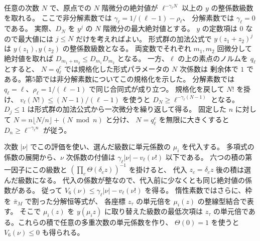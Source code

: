 任意の次数 \(N\) で、原点での \(N\) 階微分の絶対値が
\(\ell^{-\gamma_\ell N}\) 以上の \(y\) の整係数級数を取れる。
ここで非分解素数では \(\gamma_\ell=1/(\ell-1)-\rho_\ell\)、
分解素数では \(\gamma_\ell=0\) である。
実際、\(D_N\) を \(y^j\) の \(N\) 階微分の最大絶対値とする。
\(y\) の定数項は \(0\) なので最大値には \(j\le N\) だけを考えればよい。
形式群の加法公式で \(y(z_1+z_2)^j\) は \(y(z_1),y(z_2)\) の整係数級数となる。
両変数でそれぞれ \(m_1,m_2\) 回微分して絶対値を取れば
\(D_{m_1+m_2}\le D_{m_1}D_{m_2}\) となる。
一方、\(\ell\) の上の素点のノルムを \(q_\ell\) とすると、
\(N=q_\ell^e\) では規格化した形式パラメータの \(N\) 次係数は
剰余体で \(1\) である。第5節では非分解素数についてこの規格化を示した。
分解素数では \(q_\ell=\ell\)、\(\rho_\ell=1/(\ell-1)\) で同じ合同式が成り立つ。
規格化を戻して \(N!\) を掛け、
\(v_\ell(N!)\le(N-1)/(\ell-1)\) を使うと \(D_N\ge\ell^{-\gamma_\ell(N-1)}\) となる。
\(D_j\le1\) は形式群の加法公式から一次微分を繰り返して得る。
固定した \(n\) に対して \(N=n\lfloor N/n\rfloor+(N\bmod n)\) と分け、
\(N=q_\ell^e\) を無限に大きくすると \(D_n\ge\ell^{-\gamma_\ell n}\) が従う。

次数 \(|\nu|\) でこの評価を使い、選んだ級数に単元係数の \(\mu_i\) を代入する。
多項式の係数の展開から、\(\nu\) 次係数の付値は
\(\gamma_\ell|\nu|-v_\ell(\nu!)\) 以下である。
六つの積の第一因子にこの級数と \((\prod_c\Theta(\delta_c z))^{-1}\) を掛けると、
代入 \(z_c=\delta_c z\) 後の積は選んだ級数になる。
代入の係数が整なので、代入前に少なくとも同じ絶対値の係数がある。
従って \(V_6(\nu)\le\gamma_\ell|\nu|-v_\ell(\nu!)\) を得る。
惰性素数ではさらに、枠を \(\bar\pi_M\) で割った分解恒等式が、
各座標 \(z_\tau\) の単元倍を \(\mu_i(z)\) の整線型結合で表す。
そこで \(\mu_i(z)\) を \(y(\mu_i z)\) に取り替えた級数の最低次項は
\(z_\tau\) の単元倍である。これらの積で任意の多重次数の単元係数を作り、
\(\Theta(0)=1\) を使うと \(V_6(\nu)\le0\) も得られる。

